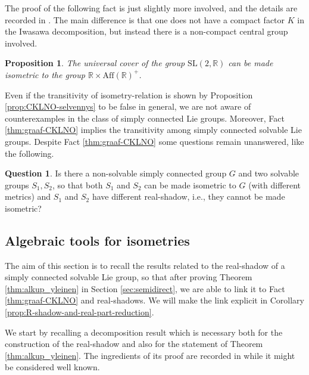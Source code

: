 \documentclass[a4paper,12pt]{amsart}
\newcommand{\pp}{\mathrm}
\theoremstyle{plain}
\theoremstyle{definition}
\newtheorem{Kysy}[maar]{Question}
\theoremstyle{plain}
\newtheorem{prop}[maar]{Proposition}
\theoremstyle{remark}
\begin{document}
The proof of the following fact is just slightly more involved, and the details are recorded in \cite[Theorem 3.24]{avain:CKLNO}. The main difference is that one does not have a compact factor \( K\) in the Iwasawa decomposition, but instead there is a non-compact central group involved.
\begin{prop} \label{prop:CKLNO-selvennys2}
	The universal cover of the group \( \pp{SL}(2,\mathbb{R}) \) can be made isometric to the group \( \mathbb{R} \times \pp{Aff}(\mathbb{R})^+  \).
\end{prop}


Even if the transitivity of isometry-relation is  shown by Proposition \ref{prop:CKLNO-selvennys} to be false in general, we are not aware of counterexamples in the class of simply connected Lie groups. Moreover, Fact \ref{thm:graaf-CKLNO} implies the transitivity among simply connected solvable Lie groups. 
Despite Fact \ref{thm:graaf-CKLNO} some questions remain unanswered, like the following.



\begin{Kysy}
	Is there a non-solvable simply connected group \( G \) and two solvable groups \( S_1,S_2 \), so that both \( S_1 \) and \( S_2 \)  can be made isometric to \( G \) (with different metrics) and \( S_1 \) and \( S_2 \) have different real-shadow, i.e., they cannot be made isometric?
\end{Kysy}




\subsection{Algebraic tools for isometries}

\label{sec:preliminaries_isometries}

The aim of this section is to recall the results related to the real-shadow of a simply connected solvable Lie group, so that after proving Theorem \ref{thm:alkup_yleinen} in Section \ref{sec:semidirect}, we are able to link it to Fact \ref{thm:graaf-CKLNO} and real-shadows. We will make the link explicit in Corollary \ref{prop:R-shadow-and-real-part-reduction}.

We start by recalling a decomposition result which is necessary both for the construction of the real-shadow and also for the statement of Theorem \ref{thm:alkup_yleinen}.
The ingredients of its proof are recorded in \cite[Section 2]{seba-enrico-dilations} while it might be considered well known.
\end{document}
